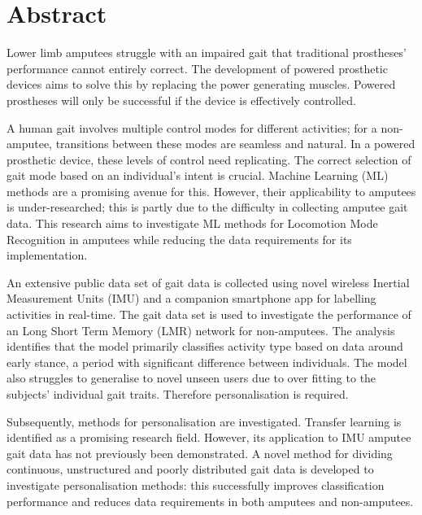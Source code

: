 \chapter*{Abstract} %
Lower limb amputees struggle with an impaired gait that traditional prostheses' performance cannot entirely correct. The development of powered prosthetic devices aims to solve this by replacing the power generating muscles. Powered prostheses will only be successful if the device is effectively controlled.

A human gait involves multiple control modes for different activities; for a non-amputee, transitions between these modes are seamless and natural. In a powered prosthetic device, these levels of control need replicating. The correct selection of gait mode based on an individual's intent is crucial. Machine Learning (ML) methods are a promising avenue for this. However, their applicability to amputees is under-researched; this is partly due to the difficulty in collecting amputee gait data. This research aims to investigate ML methods for Locomotion Mode Recognition in amputees while reducing the data requirements for its implementation.

An extensive public data set of gait data is collected using novel wireless Inertial Measurement Units (IMU) and a companion smartphone app for labelling activities in real-time. The gait data set is used to investigate the performance of an Long Short Term Memory (LMR) network for non-amputees. The analysis identifies that the model primarily classifies activity type based on data around early stance, a period with significant difference between individuals. The model also struggles to generalise to novel unseen users due to over fitting to the subjects' individual gait traits. Therefore personalisation is required. 

Subsequently, methods for personalisation are investigated. Transfer learning is identified as a promising research field. However, its application to IMU amputee gait data has not previously been demonstrated. A novel method for dividing continuous, unstructured and poorly distributed gait data is developed to investigate personalisation methods: this successfully improves classification performance and reduces data requirements in both amputees and non-amputees.
